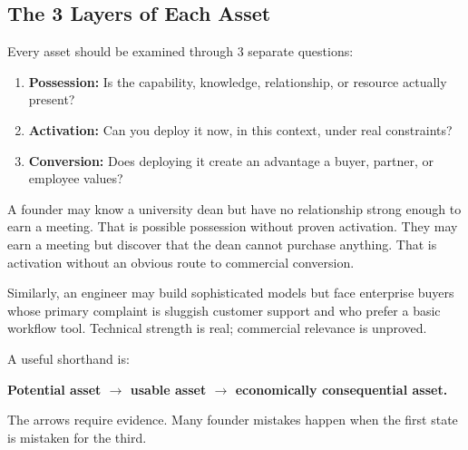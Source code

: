 \subsection{The 3 Layers of Each Asset}

Every asset should be examined through 3 separate questions:

\begin{enumerate}[label=\textbf{\arabic*.},leftmargin=11pt,itemsep=1.5pt,topsep=1.5pt,parsep=0pt]
  \item \textbf{Possession:} Is the capability, knowledge, relationship, or resource actually present?
  \item \textbf{Activation:} Can you deploy it now, in this context, under real constraints?
  \item \textbf{Conversion:} Does deploying it create an advantage a buyer, partner, or employee values?
\end{enumerate}

A founder may know a university dean but have no relationship strong enough to earn a meeting. That is possible possession without proven activation. They may earn a meeting but discover that the dean cannot purchase anything. That is activation without an obvious route to commercial conversion.

Similarly, an engineer may build sophisticated models but face enterprise buyers whose primary complaint is sluggish customer support and who prefer a basic workflow tool. Technical strength is real; commercial relevance is unproved.

A useful shorthand is:
\begin{center}
\textbf{Potential asset $\rightarrow$ usable asset $\rightarrow$ economically consequential asset.}
\end{center}

The arrows require evidence. Many founder mistakes happen when the first state is mistaken for the third.
